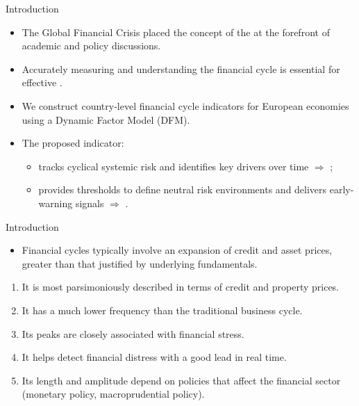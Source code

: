 \documentclass{beamer}
\begin{document}
\begin{frame}{Introduction}

\begin{itemize}
    \item The Global Financial Crisis placed the concept of the  at the forefront of academic and policy discussions.
    \item Accurately measuring and understanding the financial cycle is essential for effective .
\end{itemize}

\vspace{0.2cm}
\begin{itemize}
    \item We construct country-level financial cycle indicators for European economies using a Dynamic Factor Model (DFM).
    \item The proposed indicator:
    \begin{itemize}
        \item tracks cyclical systemic risk and identifies key drivers over time $\Rightarrow$ ;
        \item provides thresholds to define neutral risk environments and delivers early-warning signals $\Rightarrow$ .
    \end{itemize}
\end{itemize}

\end{frame}

\begin{frame}{Introduction}

\begin{itemize}
    \item Financial cycles typically involve an expansion of credit and asset prices, greater than that justified by underlying fundamentals. 
\end{itemize}


\begin{enumerate}
    \item It is most parsimoniously described in terms of credit and property prices.
    \item It has a much lower frequency than the traditional business cycle.
    \item Its peaks are closely associated with financial stress.
    \item It helps detect financial distress with a good lead in real time.
    \item Its length and amplitude depend on policies that affect the financial sector (monetary policy, macroprudential policy).
    
\end{enumerate}
\end{frame}
\end{document}
